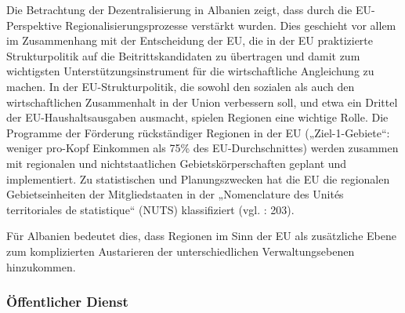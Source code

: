Die Betrachtung der Dezentralisierung in Albanien zeigt, dass durch die EU-Perspektive Regionalisierungsprozesse verstärkt wurden. Dies geschieht vor allem im Zusammenhang mit der Entscheidung der EU, die in der EU praktizierte Strukturpolitik auf die Beitrittskandidaten zu übertragen und damit zum wichtigsten Unterstützungsinstrument für die wirtschaftliche Angleichung zu machen. In der EU-Strukturpolitik, die sowohl den sozialen als auch den wirtschaftlichen Zusammenhalt in der Union verbessern soll, und etwa ein Drittel der EU-Haushaltsausgaben ausmacht, spielen Regionen eine wichtige Rolle. Die Programme der Förderung rückständiger Regionen in der EU („Ziel-1-Gebiete“: weniger pro-Kopf Einkommen als 75\% des EU-Durchschnittes) werden zusammen mit regionalen und nichtstaatlichen Gebietskörperschaften geplant und implementiert. Zu statistischen und Planungszwecken hat die EU die regionalen Gebietseinheiten der Mitgliedstaaten in der „Nomenclature des Unités territoriales de statistique“ (NUTS) klassifiziert (vgl. \cite{brusis09} : 203).\par
Für Albanien bedeutet dies, dass Regionen im Sinn der EU als zusätzliche Ebene zum komplizierten Austarieren der unterschiedlichen Verwaltungsebenen hinzukommen.
\subsubsection{Öffentlicher Dienst} 

